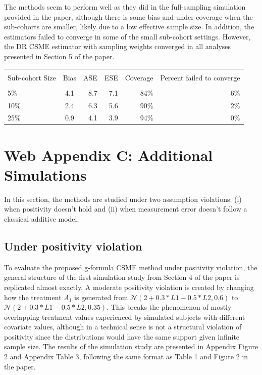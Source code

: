 \documentclass[12pt]{article}
\newcounter{tblcap}
\def\tblhead#1{\hline\\[-9pt]#1\\\hline\\[-9.75pt]}
\def\lastline{\\\hline}
\begin{document}
The methods seem to perform well as they did in the full-sampling simulation provided in the paper, although there is some bias and under-coverage when the sub-cohorts are smaller, likely due to a low effective sample size. In addition, the estimators failed to converge in some of the small sub-cohort settings. However, the DR CSME estimator with sampling weights converged in all analyses presented in Section 5 of the paper.

\begin{table}[h]
{\tabcolsep=6.25pt
\begin{tabular}{@{}lcrrrr@{}}
\tblhead{Sub-cohort Size & Bias & ASE & ESE & Coverage & Percent failed to converge}
5\% & 4.1 & 8.7 & 7.1 & 84\% & 6\% \\
10\% & 2.4 & 6.3 & 5.6 & 90\% & 2\% \\
25\% & 0.9 & 4.1 & 3.9 & 94\% & 0\%
\lastline
\end{tabular}}
\end{table}

\section{Web Appendix C: Additional Simulations}

In this section, the methods are studied under two assumption violations: (i) when positivity doesn't hold and (ii) when measurement error doesn't follow a classical additive model.

\subsection{Under positivity violation}

To evaluate the proposed g-formula CSME method under positivity violation, the general structure of the first simulation study from Section 4 of the paper is replicated almost exactly. A moderate positivity violation is created by changing how the treatment $A_{1}$ is generated from $\mathcal{N}(2 + 0.3*L1 - 0.5*L2, 0.6)$ to $\mathcal{N}(2 + 0.3*L1 - 0.5*L2, 0.35)$. This breaks the phenomenon of mostly overlapping treatment values experienced by simulated subjects with different covariate values, although in a technical sense is not a structural violation of positivity since the distributions would have the same support given infinite sample size. The results of the simulation study are presented in Appendix Figure 2 and Appendix Table 3, following the same format as Table 1 and Figure 2 in the paper.
\end{document}
